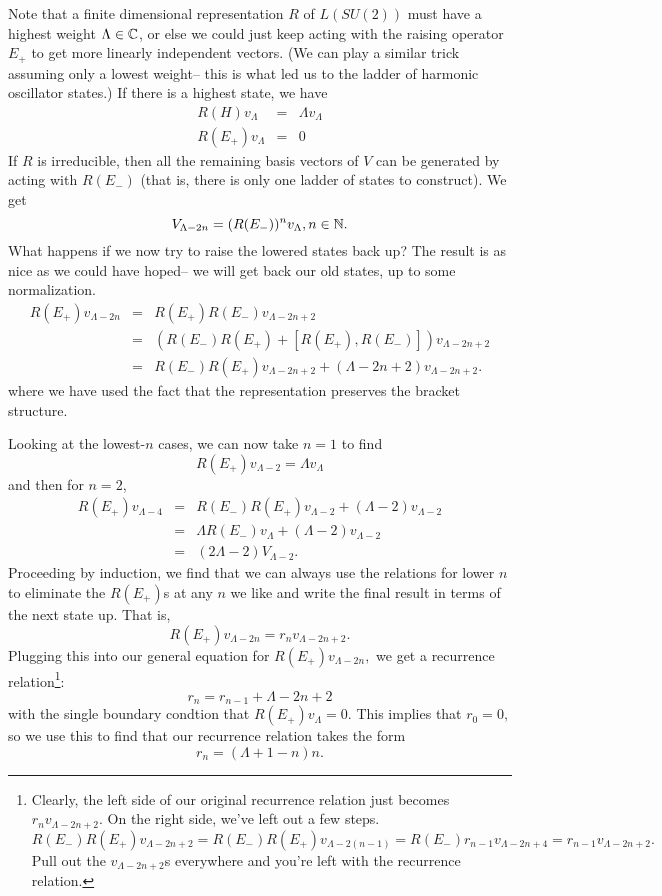 Note that a finite dimensional representation $R$ of $L(SU(2))$ must have a highest weight $\Lambda \in \mathbb{C}$, or else we could just keep acting with the raising operator $E_+$ to get more linearly independent vectors. (We can play a similar trick assuming only a lowest weight-- this is what led us to the ladder of harmonic oscillator states.)
If there is a highest state, we have
\begin{eqnarray*}
R(H)v_\Lambda&=&\Lambda v_\Lambda\\
R(E_+)v_\Lambda &=&0
\end{eqnarray*}
If $R$ is irreducible, then all the remaining basis vectors of $V$ can be generated by acting with $R(E_-)$ (that is, there is only one ladder of states to construct). We get
$$V_{\Lambda-2n}=(R(E_-))^n v_\Lambda, n\in \mathbb{N}.$$
What happens if we now try to raise the lowered states back up? The result is as nice as we could have hoped-- we will get back our old states, up to some normalization.
\begin{eqnarray*}
R(E_+)v_{\Lambda-2n} &=&R(E_+) R(E_-)v_{\Lambda-2n+2}\\
&=&(R(E_-)R(E_+)+[R(E_+),R(E_-)]) v_{\Lambda -2n + 2}\\
&=& R(E_-)R(E_+)v_{\Lambda -2n+2} + (\Lambda -2n+2) v_{\Lambda-2n+2}.
\end{eqnarray*}
where we have used the fact that the representation preserves the bracket structure.

Looking at the lowest-$n$ cases, we can now take $n=1$ to find
$$R(E_+)v_{\Lambda-2}=\Lambda v_\Lambda$$
and then for $n=2$,
\begin{eqnarray*}
R(E_+)v_{\Lambda-4}&=&R(E_-)R(E_+)v_{\Lambda-2}+(\Lambda-2)v_{\Lambda-2}\\
&=&\Lambda R(E_-)v_\Lambda +(\Lambda-2)v_{\Lambda-2}\\
&=&(2\Lambda-2) V_{\Lambda-2}.
\end{eqnarray*}
Proceeding by induction, we find that we can always use the relations for lower $n$ to eliminate the $R(E_+)$s at any $n$ we like and write the final result in terms of the next state up. That is,
$$R(E_+)v_{\Lambda -2n}= r_n v_{\Lambda-2n+2}.$$
Plugging this into our general equation for $R(E_+)v_{\Lambda-2n},$ we get a recurrence relation\footnote{Clearly, the left side of our original recurrence relation just becomes $r_n v_{\Lambda-2n+2}$. On the right side, we've left out a few steps. $R(E_-)R(E_+)v_{\Lambda-2n+2}=R(E_-)R(E_+)v_{\Lambda-2(n-1)}=R(E_-)r_{n-1}v_{\Lambda -2n+4} = r_{n-1}v_{\Lambda-2n+2}.$ Pull out the $v_{\Lambda-2n+2}$s everywhere and you're left with the recurrence relation.}:
$$r_n = r_{n-1}+\Lambda -2n+2$$
with the single boundary condtion that $R(E_+)v_\Lambda =0$. This implies that $r_0=0,$ so we use this to find that our recurrence relation takes the form
$$r_n=(\Lambda+1-n)n.$$

